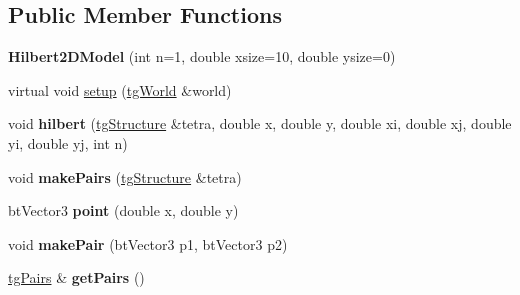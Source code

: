 \subsection*{Public Member Functions}
\begin{DoxyCompactItemize}
\item 
\hypertarget{class_hilbert2_d_model_ac8ef846383b53494094f6337e52ae2c3}{{\bfseries Hilbert2\-D\-Model} (int n=1, double xsize=10, double ysize=0)}\label{class_hilbert2_d_model_ac8ef846383b53494094f6337e52ae2c3}

\item 
virtual void \hyperlink{class_hilbert2_d_model_aaf9926d279ec53308991aa86df6fb06b}{setup} (\hyperlink{classtg_world}{tg\-World} \&world)
\item 
\hypertarget{class_hilbert2_d_model_a82e9d6b0bfff40e822259f3bcfc19af8}{void {\bfseries hilbert} (\hyperlink{classtg_structure}{tg\-Structure} \&tetra, double x, double y, double xi, double xj, double yi, double yj, int n)}\label{class_hilbert2_d_model_a82e9d6b0bfff40e822259f3bcfc19af8}

\item 
\hypertarget{class_hilbert2_d_model_a18234b1209d38c53627d7ecdf726aa52}{void {\bfseries make\-Pairs} (\hyperlink{classtg_structure}{tg\-Structure} \&tetra)}\label{class_hilbert2_d_model_a18234b1209d38c53627d7ecdf726aa52}

\item 
\hypertarget{class_hilbert2_d_model_ab0c37bf3d5774226ef20b323d94bc66d}{bt\-Vector3 {\bfseries point} (double x, double y)}\label{class_hilbert2_d_model_ab0c37bf3d5774226ef20b323d94bc66d}

\item 
\hypertarget{class_hilbert2_d_model_aa60dc4e60bd901b42eb00725be9d74b9}{void {\bfseries make\-Pair} (bt\-Vector3 p1, bt\-Vector3 p2)}\label{class_hilbert2_d_model_aa60dc4e60bd901b42eb00725be9d74b9}

\item 
\hypertarget{class_hilbert2_d_model_a7b34417cebef6a974679c2e0024f036b}{\hyperlink{classtg_pairs}{tg\-Pairs} \& {\bfseries get\-Pairs} ()}\label{class_hilbert2_d_model_a7b34417cebef6a974679c2e0024f036b}


\end{DoxyCompactItemize}
